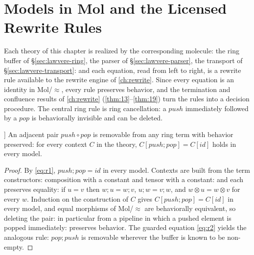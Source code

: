 \section{Models in Mol and the Licensed Rewrite Rules}\label{sec:lawvere-rewrite}

Each theory of this chapter is realized by the corresponding molecule:
the ring buffer of \S\ref{sec:lawvere-ring}, the parser of
\S\ref{sec:lawvere-parser}, the transport of
\S\ref{sec:lawvere-transport}: and each equation, read from left to
right, is a rewrite rule available to the rewrite engine of
\autoref{ch:rewrite}. Since every equation is an identity in Mol/$\approx$,
every rule preserves behavior, and the termination and confluence results
of \autoref{ch:rewrite} (\autoref{thm:13}--\autoref{thm:19}) turn the rules into a decision
procedure. The central ring rule is ring cancellation: a $\mathit{push}$
immediately followed by a $\mathit{pop}$ is behaviorally invisible and can
be deleted.

\begin{theorem}[Ring cancellation (\autoref{thm:12}) [N]]\label{thm:12}
An adjacent pair $\mathit{push}\circ\mathit{pop}$ is removable from any ring
term with behavior preserved: for every context $C$ in the theory,
$C[\mathit{push};\mathit{pop}] = C[\mathit{id}]$ holds in every model.
\end{theorem}

\begin{proof}
By \eqref{eq:r1}, $\mathit{push};\mathit{pop} = \mathit{id}$ in every
model. Contexts are built from the term constructors: composition with a
constant and tensor with a constant: and each preserves equality: if
$u = v$ then $w;u = w;v$, $u;w = v;w$, and $w \otimes u = w \otimes v$ for
every $w$. Induction on the construction of $C$ gives
$C[\mathit{push};\mathit{pop}] = C[\mathit{id}]$ in every model, and equal
morphisms of Mol/$\approx$ are behaviorally equivalent, so deleting the
pair: in particular from a pipeline in which a pushed element is popped
immediately: preserves behavior. The guarded equation \eqref{eq:r2}
yields the analogous rule: $\mathit{pop};\mathit{push}$ is removable
wherever the buffer is known to be non-empty.
\end{proof}

